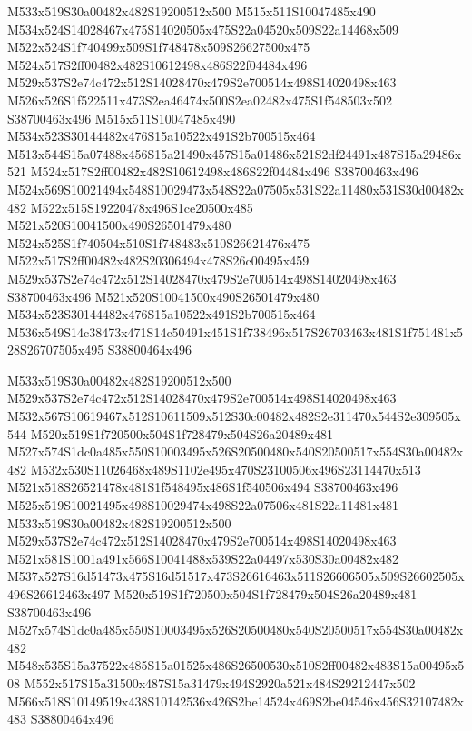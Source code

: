 \documentclass{article}
\begin{document}
\begin{multicols}{2}
M533x519S30a00482x482S19200512x500 M515x511S10047485x490 M534x524S14028467x475S14020505x475S22a04520x509S22a14468x509 M522x524S1f740499x509S1f748478x509S26627500x475 M524x517S2ff00482x482S10612498x486S22f04484x496 M529x537S2e74c472x512S14028470x479S2e700514x498S14020498x463 M526x526S1f522511x473S2ea46474x500S2ea02482x475S1f548503x502 S38700463x496 M515x511S10047485x490 M534x523S30144482x476S15a10522x491S2b700515x464 M513x544S15a07488x456S15a21490x457S15a01486x521S2df24491x487S15a29486x521 M524x517S2ff00482x482S10612498x486S22f04484x496 S38700463x496 M524x569S10021494x548S10029473x548S22a07505x531S22a11480x531S30d00482x482 M522x515S19220478x496S1ce20500x485 M521x520S10041500x490S26501479x480 M524x525S1f740504x510S1f748483x510S26621476x475 M522x517S2ff00482x482S20306494x478S26c00495x459 M529x537S2e74c472x512S14028470x479S2e700514x498S14020498x463 S38700463x496 M521x520S10041500x490S26501479x480 M534x523S30144482x476S15a10522x491S2b700515x464 M536x549S14c38473x471S14c50491x451S1f738496x517S26703463x481S1f751481x528S26707505x495 S38800464x496

M533x519S30a00482x482S19200512x500 M529x537S2e74c472x512S14028470x479S2e700514x498S14020498x463 M532x567S10619467x512S10611509x512S30c00482x482S2e311470x544S2e309505x544 M520x519S1f720500x504S1f728479x504S26a20489x481 M527x574S1dc0a485x550S10003495x526S20500480x540S20500517x554S30a00482x482 M532x530S11026468x489S1102e495x470S23100506x496S23114470x513 M521x518S26521478x481S1f548495x486S1f540506x494 S38700463x496 M525x519S10021495x498S10029474x498S22a07506x481S22a11481x481 M533x519S30a00482x482S19200512x500 M529x537S2e74c472x512S14028470x479S2e700514x498S14020498x463 M521x581S1001a491x566S10041488x539S22a04497x530S30a00482x482 M537x527S16d51473x475S16d51517x473S26616463x511S26606505x509S26602505x496S26612463x497 M520x519S1f720500x504S1f728479x504S26a20489x481 S38700463x496 M527x574S1dc0a485x550S10003495x526S20500480x540S20500517x554S30a00482x482 M548x535S15a37522x485S15a01525x486S26500530x510S2ff00482x483S15a00495x508 M552x517S15a31500x487S15a31479x494S2920a521x484S29212447x502 M566x518S10149519x438S10142536x426S2be14524x469S2be04546x456S32107482x483 S38800464x496


\end{multicols}
\end{document}
